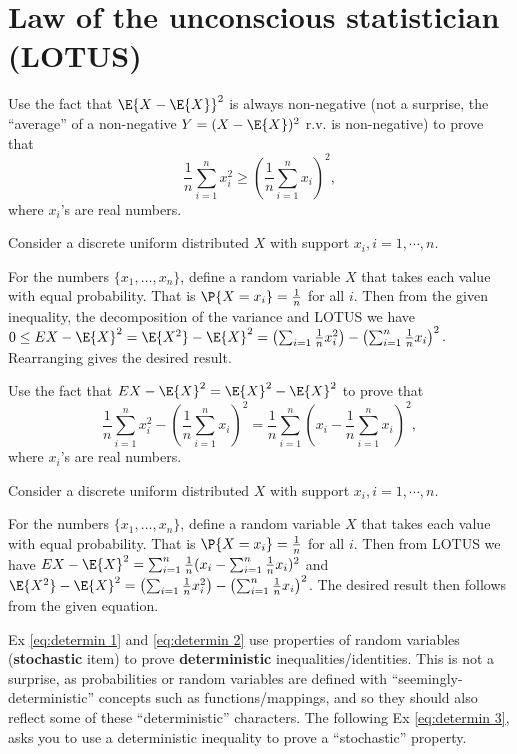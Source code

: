 \section{Law of the unconscious statistician (LOTUS)}
\label{sec:section-4.7}

 \begin{exercise}\label{eq:determin 1}
 	Use the fact that $\E{X-\E{X}}^2$ is always non-negative (not a surprise, the ``average'' of a non-negative $Y=(X-\E{X})^2$ r.v. is non-negative) to prove that 
 	$$\frac{1}{n}\sum_{i=1}^n x_i^2 \geq \left(\frac{1}{n}\sum_{i=1}^n x_i \right)^2,$$
 	where $x_i$'s are real numbers.
	\begin{hint}
		Consider a discrete uniform distributed $X$ with support $x_i, i=1,\cdots, n$.
	\end{hint}
	\begin{solution}
		For the numbers $\{x_1,\dots,x_n\}$, define a random variable $X$ that takes each value with equal probability. That is $\P{X=x_i}=\frac{1}{n}$ for all $i$. Then from the given inequality, the decomposition of the variance and LOTUS we have $0\leq E{X-\E{X}}^2=\E{X^2}-\E{X}^2=\left(\sum_{i=1}\frac{1}{n}x_i^2\right)- \left(\sum_{i=1}^n\frac{1}{n}x_i\right)^2$. Rearranging gives the desired result.
	\end{solution}
\end{exercise}

 \begin{exercise}\label{eq:determin 2}
	Use the fact that $E{X-\E{X}}^2=\E{X}^2-\E{X}^2$ to prove that 
	$$\frac{1}{n}\sum_{i=1}^n x_i^2 - \left(\frac{1}{n}\sum_{i=1}^n x_i \right)^2=\frac{1}{n}\sum_{i=1}^n\left(x_i- \frac{1}{n}\sum_{i=1}^n x_i \right)^2,$$
	where $x_i$'s are real numbers.
	\begin{hint}
		Consider a discrete uniform distributed $X$ with support $x_i, i=1,\cdots, n$.
	\end{hint}
	\begin{solution} 
		For the numbers $\{x_1,\dots,x_n\}$, define a random variable $X$ that takes each value with equal probability. That is $\P{X=x_i}=\frac{1}{n}$ for all $i$. Then from LOTUS we have $E{X-\E{X}}^2=\sum_{i=1}^n\frac{1}{n}(x_i-\sum_{i=1}^n\frac{1}{n}x_i)^2$ and $\E{X^2}-\E{X}^2=\left(\sum_{i=1}\frac{1}{n}x_i^2\right)- \left(\sum_{i=1}^n\frac{1}{n}x_i\right)^2$. The desired result then follows from the given equation.
	\end{solution}
\end{exercise}
\begin{remark}
	Ex \ref{eq:determin 1} and \ref{eq:determin 2} use properties of random variables (\textbf{stochastic} item) to prove \textbf{deterministic} inequalities/identities. This is not a surprise, as probabilities or random variables are defined with ``seemingly-deterministic'' concepts such as functions/mappings, and so they should also reflect some of these ``deterministic'' characters. The following Ex \ref{eq:determin 3}, asks you to use a deterministic inequality to prove a ``stochastic'' property.
\end{remark}

